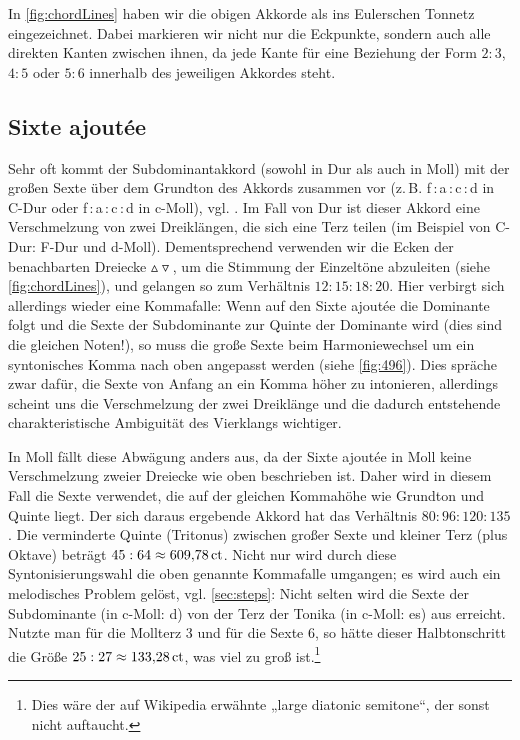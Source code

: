 In \cref{fig:chordLines} haben wir die obigen Akkorde als ins Eulerschen Tonnetz
eingezeichnet. Dabei markieren wir nicht nur die Eckpunkte, sondern auch alle
direkten Kanten zwischen ihnen, da jede Kante für eine Beziehung der Form $2:3$,
$4:5$ oder $5:6$ innerhalb des jeweiligen Akkordes steht.

\subsection{Sixte ajoutée}
\label{sec:sixte}

Sehr oft kommt der Subdominantakkord (sowohl in Dur als auch in Moll) mit der
großen Sexte über dem Grundton des Akkords zusammen vor
(z.\,B. f\,:\,a\,:\,c\,:\,d in C-Dur oder f\,:\,\flat a\,:\,c\,:\,d in c-Moll),
vgl. \cite[{}9.3]{Skript}.  Im Fall von Dur ist dieser Akkord eine Verschmelzung
von zwei Dreiklängen, die sich eine Terz teilen (im Beispiel von C-Dur: F-Dur
und d-Moll). Dementsprechend verwenden wir die Ecken der benachbarten Dreiecke
$\vartriangle\!\!\!\triangledown$, um die Stimmung der Einzeltöne abzuleiten
(siehe \cref{fig:chordLines}), und gelangen so zum Verhältnis
$12:15:18:20$. Hier verbirgt sich allerdings wieder eine Kommafalle: Wenn auf
den Sixte ajoutée die Dominante folgt und die Sexte der Subdominante zur Quinte
der Dominante wird (dies sind die gleichen Noten!), so muss die große Sexte beim
Harmoniewechsel um ein syntonisches Komma nach oben angepasst werden (siehe
\cref{fig:496}).  Dies spräche zwar dafür, die Sexte von Anfang an ein Komma
höher zu intonieren, allerdings scheint uns die Verschmelzung der zwei
Dreiklänge und die dadurch entstehende charakteristische Ambiguität des
Vierklangs wichtiger.

In Moll fällt diese Abwägung anders aus, da der Sixte ajoutée in Moll keine
Verschmelzung zweier Dreiecke wie oben beschrieben ist.  Daher wird in diesem
Fall die Sexte verwendet, die auf der gleichen Kommahöhe wie Grundton und Quinte
liegt. Der sich daraus ergebende Akkord hat das Verhältnis $80:96:120:135$.  Die
verminderte Quinte (Tritonus) zwischen großer Sexte und kleiner Terz (plus
Oktave) beträgt $45:64\approx 609{,}78\,\text{ct}$.  Nicht nur wird durch diese
Syntonisierungswahl die oben genannte Kommafalle umgangen; es wird auch ein
melodisches Problem gelöst, vgl. \cref{sec:steps}: Nicht selten wird die Sexte
der Subdominante (in c-Moll: d) von der Terz der Tonika (in c-Moll: es) aus
erreicht.  Nutzte man für die Mollterz \flatp $3$ und für die Sexte \naturalp
$6$, so hätte dieser Halbtonschritt die Größe $25:27\approx 133{,}28\,\text{ct}$,
was viel zu groß ist.\footnote{Dies wäre der auf Wikipedia erwähnte „large
  diatonic semitone“, der sonst nicht auftaucht.}


